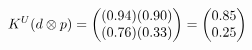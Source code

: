 \documentclass[preview]{standalone}
\begin{document}
\begin{align*}
\special{dvisvgm:raw <g id='unique000'>}K^U(d \otimes p) = \begin{pmatrix} (0.94)(0.90) \\ (0.76)(0.33) \end{pmatrix} = \begin{pmatrix} 0.85 \\ 0.25 \end{pmatrix}\special{dvisvgm:raw </g>}
\end{align*}
\end{document}
